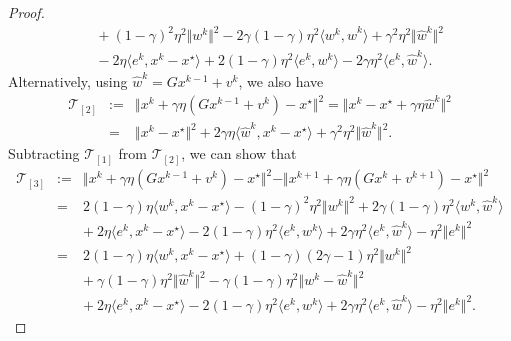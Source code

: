 \documentclass[10pt,a4paper]{amsart}
\newcommand{\Tc}{\mathcal{T}}
\newcommand{\iprods}[1]{\langle #1\rangle}
\newcommand{\norms}[1]{\Vert#1\Vert}
\begin{document}
\begin{proof}
\begin{equation*}
\begin{array}{lcl}
&& + {~}  (1-\gamma)^2\eta^2\norms{w^k}^2 - 2\gamma(1-\gamma)\eta^2\iprods{w^k, \hat{w}^k} + \gamma^2\eta^2\norms{\hat{w}^k}^2 \\
&& -  {~}  2\eta\iprods{e^k, x^k - x^{\star}}  + 2(1-\gamma)\eta^2 \iprods{e^k, w^k} - 2\gamma\eta^2 \iprods{e^k, \hat{w}^k}.
\end{array} 
\end{equation*}
Alternatively, using $\hat{w}^k = Gx^{k-1} + v^k$, we also have
\begin{equation*} 
\begin{array}{lcl}
\Tc_{[2]} &:= & \norms{x^k + \gamma \eta(Gx^{k-1} + v^k) - x^{\star}}^2 = \norms{x^k - x^{\star} + \gamma\eta\hat{w}^k }^2 \\
& = & \norms{x^k - x^{\star}}^2 + 2\gamma\eta\iprods{\hat{w}^k, x^k - x^{\star}} + \gamma^2\eta^2\norms{\hat{w}^k}^2.
\end{array} 
\end{equation*}
Subtracting $\Tc_{[1]}$ from $\Tc_{[2]}$, we can show that
\begin{equation}\label{eq:VROG4NI_key_bound_proof2} 
\begin{array}{lcl}
\Tc_{[3]} &:= & \norms{x^k + \gamma \eta(Gx^{k-1} + v^k) - x^{\star}}^2 - \norms{x^{k+1} + \gamma\eta(Gx^k + v^{k+1}) - x^{\star}}^2 \\
& = & 2(1-\gamma)\eta\iprods{w^k, x^k - x^{\star}} -  (1-\gamma)^2\eta^2\norms{w^k}^2 + 2\gamma(1-\gamma)\eta^2\iprods{w^k, \hat{w}^k} \\
&& +  {~}  2\eta\iprods{e^k, x^k - x^{\star}}  - 2(1-\gamma)\eta^2 \iprods{e^k, w^k} + 2\gamma\eta^2 \iprods{e^k, \hat{w}^k} - \eta^2\norms{e^k}^2 \\
& = & 2(1-\gamma)\eta \iprods{w^k, x^k - x^{\star}}  +  (1-\gamma)(2\gamma - 1) \eta^2 \norms{w^k}^2 \\
&& + {~}  \gamma(1-\gamma)\eta^2\norms{\hat{w}^k}^2 -  \gamma(1-\gamma)\eta^2\norms{w^k - \hat{w}^k}^2 \\
&& +  {~}  2\eta\iprods{e^k, x^k - x^{\star}}  - 2(1-\gamma)\eta^2 \iprods{e^k, w^k} + 2\gamma\eta^2 \iprods{e^k, \hat{w}^k} - \eta^2\norms{e^k}^2.

\end{array}
\end{equation}
\end{proof}
\end{document}
